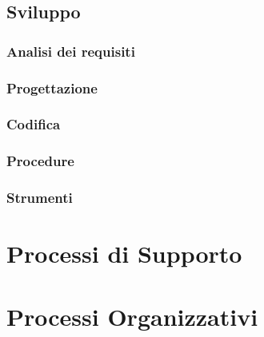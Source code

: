 \documentclass[a4paper]{article}
\begin{document}
	\subsection {Sviluppo}
		\subsubsection {Analisi dei requisiti}
		\subsubsection {Progettazione}
		\subsubsection {Codifica}
		\subsubsection {Procedure}
		\subsubsection {Strumenti}
\section {Processi di Supporto}
\section {Processi Organizzativi}
\end{document}
